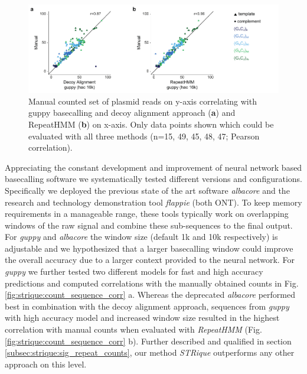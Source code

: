 \begin{figure}[h]
    \centering
    \includegraphics[width=1.0\textwidth]{figures/strique/count_seq_manual.pdf}
    \captionsetup{format=plain}
    \caption[Correlation and strand bias in STR analysis methods]{Manual counted set of plasmid reads on y-axis correlating with guppy basecalling and decoy alignment approach (\textbf{a}) and RepeatHMM (\textbf{b}) on x-axis. Only data points shown which could be evaluated with all three methods (n=15, 49, 45, 48, 47; Pearson correlation).}
    \label{fig:strique:count_seq_manual}
\end{figure}

Appreciating the constant development and improvement of neural network based basecalling software \cite{Wick2019} we systematically tested different versions and configurations. Specifically we deployed the previous state of the art software \textit{albacore} and the research and technology demonstration tool \textit{flappie} (both ONT). To keep memory requirements in a manageable range, these tools typically work on overlapping windows of the raw signal and combine these sub-sequences to the final output. For \textit{guppy} and \textit{albacore} the window size (default 1k and 10k respectively) is adjustable and we hypothesized that a larger basecalling window could improve the overall accuracy due to a larger context provided to the neural network. For \textit{guppy} we further tested two different models for fast and high accuracy predictions and computed correlations with the manually obtained counts in Fig. \ref{fig:strique:count_sequence_corr} a. 
Whereas the deprecated \textit{albacore} performed best in combination with the decoy alignment approach, sequences from \textit{guppy} with high accuracy model and increased window size resulted in the highest correlation with manual counts when evaluated with \textit{RepeatHMM} (Fig. \ref{fig:strique:count_sequence_corr} b). Further described and qualified in section \ref{subsec:strique:sig_repeat_counts}, our method \textit{STRique} outperforms any other approach on this level.


